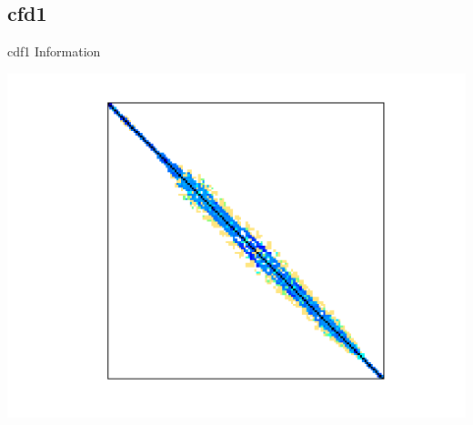 \subsection{cfd1}
\begin{table}[h!]
	\begin{minipage}{0.5\linewidth}
		\caption{cdf1 Information}
		\label{table:cdf1}
		\centering
        
	\end{minipage}\hfill
	\begin{minipage}{0.45\linewidth}
		\centering
		\includegraphics[width=1\textwidth]{figs/cfd1.png}
		\label{fig:cdf1}
	\end{minipage}
\end{table}



